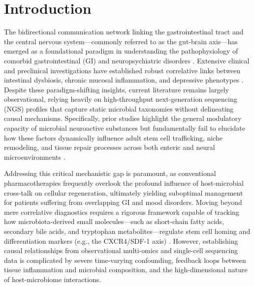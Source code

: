 \documentclass[10pt,twocolumn]{article}
\begin{document}
\section{Introduction}
The bidirectional communication network linking the gastrointestinal tract and the central nervous system—commonly referred to as the gut-brain axis—has emerged as a foundational paradigm in understanding the pathophysiology of comorbid gastrointestinal (GI) and neuropsychiatric disorders \cite{ref_2, ref_4}. Extensive clinical and preclinical investigations have established robust correlative links between intestinal dysbiosis, chronic mucosal inflammation, and depressive phenotypes \cite{target_ref, ref_1}. Despite these paradigm-shifting insights, current literature remains largely observational, relying heavily on high-throughput next-generation sequencing (NGS) profiles that capture static microbial taxonomies without delineating causal mechanisms. Specifically, prior studies highlight the general modulatory capacity of microbial neuroactive substances but fundamentally fail to elucidate how these factors dynamically influence adult stem cell trafficking, niche remodeling, and tissue repair processes across both enteric and neural microenvironments \cite{ref_3, ref_5}. 

Addressing this critical mechanistic gap is paramount, as conventional pharmacotherapies frequently overlook the profound influence of host-microbial cross-talk on cellular regeneration, ultimately yielding suboptimal management for patients suffering from overlapping GI and mood disorders. Moving beyond mere correlative diagnostics requires a rigorous framework capable of tracking how microbiota-derived small molecules—such as short-chain fatty acids, secondary bile acids, and tryptophan metabolites—regulate stem cell homing and differentiation markers (e.g., the CXCR4/SDF-1 axis) \cite{target_ref, ref_3}. However, establishing causal relationships from observational multi-omics and single-cell sequencing data is complicated by severe time-varying confounding, feedback loops between tissue inflammation and microbial composition, and the high-dimensional nature of host-microbiome interactions. 
\end{document}
